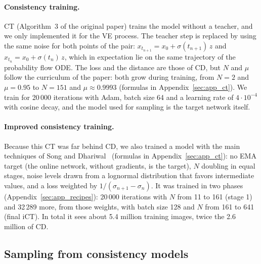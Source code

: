 \documentclass{article}
\begin{document}
\paragraph{Consistency training.} CT (Algorithm~3 of the original paper)
trains the model without a teacher, and we only implemented it for the VE
process. The teacher step is replaced by using the same noise for both points
of the pair: $x_{t_{n+1}} = x_0 + \sigma(t_{n+1})\, z$ and
$x_{t_n} = x_0 + \sigma(t_n)\, z$, which in expectation lie on the same
trajectory of the probability flow ODE. The loss and the distance are those of
CD, but $N$ and $\mu$ follow the curriculum of the paper: both grow during
training, from $N = 2$ and $\mu = 0.95$ to $N = 151$ and $\mu \approx 0.9993$
(formulas in Appendix~\ref{sec:app_ct}). We train for 20\,000 iterations with
Adam, batch size 64 and a learning rate of $4\cdot10^{-4}$ with cosine decay,
and the model used for sampling is the target network itself.

\paragraph{Improved consistency training.} Because this CT was far behind CD,
we also trained a model with the main techniques of Song and
Dhariwal~\cite{song2024improved} (formulas in Appendix~\ref{sec:app_ct}): no
EMA target (the online network, without gradients, is the target), $N$ doubling
in equal stages, noise levels drawn from a lognormal distribution that favors
intermediate values, and a loss weighted by $1/(\sigma_{n+1} - \sigma_n)$. It was
trained in two phases (Appendix~\ref{sec:app_recipes}): 20\,000 iterations with
$N$ from 11 to 161 (stage 1) and 32\,289 more, from those weights, with batch
size 128 and $N$ from 161 to 641 (final iCT). In total it sees about 5.4 million
training images, twice the 2.6 million of CD.

\subsection{Sampling from consistency models}
\label{sec:sampling}
\end{document}
